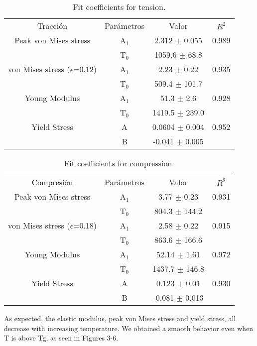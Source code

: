\begin{table}[htp]
\caption{Fit coefficients for tension.}
\begin{center}
\begin{tabular}{*{4}{c}}
Tracción & Parámetros & Valor & $R^{2}$ \\
Peak von Mises stress & A$_{1}$ & 2.312 $\pm$ 0.055 & 0.989 \\
 & T$_{0}$ & 1059.6 $\pm$ 68.8 & \\
von Mises stress ($\epsilon$=0.12) & A$_{1}$ & 2.23 $\pm$ 0.22 & 0.935 \\
 & T$_{0}$ & 509.4 $\pm$ 101.7 & \\
Young Modulus & A$_{1}$ & 51.3 $\pm$ 2.6 & 0.928 \\
 & T$_{0}$ & 1419.5 $\pm$ 239.0 & \\
Yield Stress & A & 0.0604 $\pm$ 0.004 & 0.952 \\
 & B & -0.041 $\pm$ 0.005 & 
\end{tabular}
\end{center}
\label{C3:tb:initPropsTen}
\end{table}

\begin{table}[htp]
\caption{Fit coefficients for compression.}
\begin{center}
\begin{tabular}{*{4}{c}}
Compresión & Parámetros & Valor & $R^{2}$ \\
Peak von Mises stress & A$_{1}$ & 3.77 $\pm$ 0.23 & 0.931 \\
 & T$_{0}$ & 804.3 $\pm$ 144.2 & \\
von Mises stress ($\epsilon$=0.18) & A$_{1}$ & 2.58 $\pm$ 0.22 & 0.915 \\
 & T$_{0}$ & 863.6 $\pm$ 166.6 & \\
Young Modulus & A$_{1}$ & 52.14 $\pm$ 1.61 & 0.972 \\
 & T$_{0}$ & 1437.7 $\pm$ 146.8 & \\
Yield Stress & A & 0.123 $\pm$ 0.01 & 0.930 \\
 & B & -0.081 $\pm$ 0.013 & 
\end{tabular}
\end{center}
\label{C3:tb:initPropsComp}
\end{table}

As expected, the elastic modulus, peak von Mises stress and yield stress, all decrease with increasing temperature. We obtained a smooth behavior even when T is above Tg, as seen in Figures 3-6.

